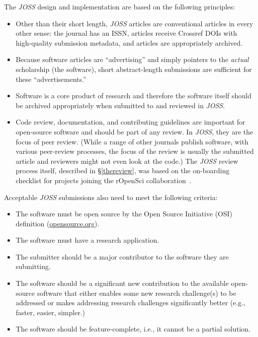 \documentclass{article}
\newcommand\joss{\textit{JOSS}}
\begin{document}
The \joss{} design and %
implementation are based on the following principles:
\begin{itemize}
    \item Other than their short length, \joss{} articles are conventional articles in every other sense: the journal has an ISSN, articles receive Crossref DOIs with high-quality submission metadata, and articles are appropriately archived.
    \item Because software articles are ``advertising'' and simply pointers to the \textit{actual} scholarship (the software), short abstract-length submissions are sufficient for these ``advertisements.''
    \item Software is a core product of research and therefore the software itself should be archived appropriately when submitted to and reviewed in \joss{}.
    \item Code review, documentation, and contributing guidelines are important for open-source software and should be part of any review.
    In \joss{}, they are the focus of peer review.
    (While a range of other journals publish software,
    with various peer-review processes, the focus of the review is usually the submitted article and reviewers might not even look at the code.)
    The \joss{} review process itself, described in \S\ref{thereview}, was based on the on-boarding checklist for projects joining the rOpenSci collaboration~\cite{ropensci}.
\end{itemize}

Acceptable \joss{} submissions also need to meet the following criteria:

\begin{itemize}
    \item The software must be open source by the Open Source Initiative (OSI) definition (\href{https://opensource.org}{opensource.org}).
    \item The software must have a research application.
    \item The submitter should be a major contributor to the software they are submitting.
    \item The software should be a significant new contribution to the available open-source software that either enables some new research challenge(s) to be addressed or makes addressing research challenges significantly better (e.g., faster, easier, simpler.)
    \item The software should be feature-complete, i.e., it cannot be a partial solution.
\end{itemize}
\end{document}
